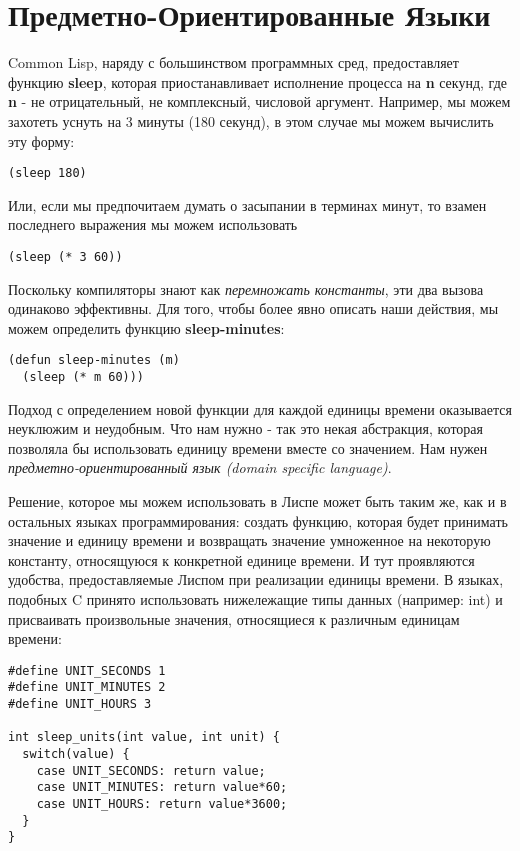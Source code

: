 \section{Предметно-Ориентированные Языки}\label{section_domain_specific_languages}

Common Lisp, наряду с большинством программных сред, предоставляет функцию \textbf{sleep}, которая приостанавливает исполнение процесса на \textbf{n} секунд, где \textbf{n} - не отрицательный, не комплексный, числовой аргумент. Например, мы можем захотеть уснуть на 3 минуты (180 секунд), в этом случае мы можем вычислить эту форму:

\begin{verbatim}
(sleep 180)
\end{verbatim}

Или, если мы предпочитаем думать о засыпании в терминах минут, то взамен последнего выражения мы можем использовать

\begin{verbatim}
(sleep (* 3 60))
\end{verbatim}

Поскольку компиляторы знают как \emph{перемножать константы}, эти два вызова одинаково эффективны. Для того, чтобы более явно описать наши действия, мы можем определить функцию \textbf{sleep-minutes}:

\begin{verbatim}
(defun sleep-minutes (m)
  (sleep (* m 60)))
\end{verbatim}

Подход с определением новой функции для каждой единицы времени оказывается неуклюжим и неудобным. Что нам нужно - так это некая абстракция, которая позволяла бы использовать единицу времени вместе со значением. Нам нужен \emph{предметно-ориентированный язык (domain specific language)}.

Решение, которое мы можем использовать в Лиспе может быть таким же, как и в остальных языках программирования: создать функцию, которая будет принимать значение и единицу времени и возвращать значение умноженное на некоторую константу, относящуюся к конкретной единице времени. И тут проявляются удобства, предоставляемые Лиспом при реализации единицы времени. В языках, подобных C принято использовать нижележащие типы данных (например: int) и присваивать произвольные значения, относящиеся к различным единицам времени:

\begin{verbatim}
#define UNIT_SECONDS 1
#define UNIT_MINUTES 2
#define UNIT_HOURS 3

int sleep_units(int value, int unit) {
  switch(value) {
    case UNIT_SECONDS: return value;
    case UNIT_MINUTES: return value*60;
    case UNIT_HOURS: return value*3600;
  }
}
\end{verbatim}

